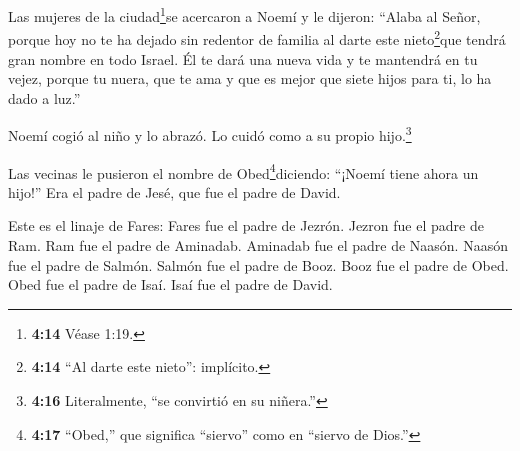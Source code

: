  Las mujeres de la ciudad\footnote{\textbf{4:14} Véase
  1:19.}se acercaron a Noemí y le dijeron: ``Alaba al Señor, porque hoy
no te ha dejado sin redentor de familia al darte este
nieto\footnote{\textbf{4:14} ``Al darte este nieto'': implícito.}que
tendrá gran nombre en todo Israel.  Él te dará una nueva
vida y te mantendrá en tu vejez, porque tu nuera, que te ama y que es
mejor que siete hijos para ti, lo ha dado a luz.''

 Noemí cogió al niño y lo abrazó. Lo cuidó como a su propio
hijo.\footnote{\textbf{4:16} Literalmente, ``se convirtió en su
  niñera.''}

 Las vecinas le pusieron el nombre de
Obed\footnote{\textbf{4:17} ``Obed,'' que significa ``siervo'' como en
  ``siervo de Dios.''}diciendo: ``¡Noemí tiene ahora un hijo!'' Era el
padre de Jesé, que fue el padre de David.

 Este es el linaje de Fares: Fares fue el padre de Jezrón.
 Jezron fue el padre de Ram. Ram fue el padre de Aminadab.
 Aminadab fue el padre de Naasón. Naasón fue el padre de
Salmón.  Salmón fue el padre de Booz. Booz fue el padre de
Obed.  Obed fue el padre de Isaí. Isaí fue el padre de
David.

